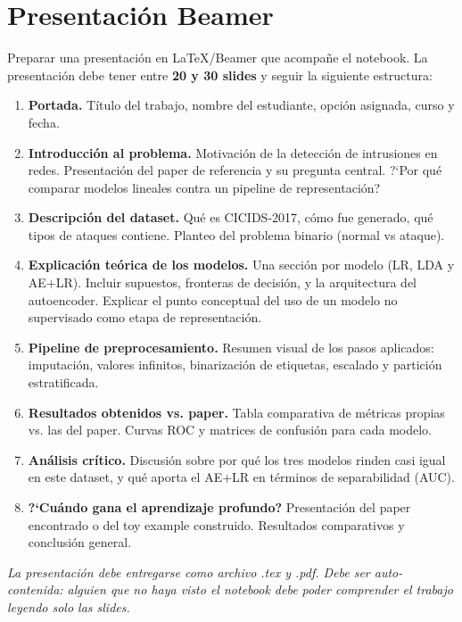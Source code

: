 \documentclass[11pt,a4paper]{article}
\begin{document}
\section{Presentaci\'on Beamer}
Preparar una presentaci\'on en LaTeX/Beamer que acompa\~ne el notebook. La presentaci\'on debe tener entre \textbf{20 y 30 slides} y seguir la siguiente estructura:
\begin{enumerate}[leftmargin=2em,itemsep=3pt]
    \item \textbf{Portada.} T\'itulo del trabajo, nombre del estudiante, opci\'on asignada, curso y fecha.
    \item \textbf{Introducci\'on al problema.} Motivaci\'on de la detecci\'on de intrusiones en redes. Presentaci\'on del paper de referencia y su pregunta central. ?`Por qu\'e comparar modelos lineales contra un pipeline de representaci\'on?
    \item \textbf{Descripci\'on del dataset.} Qu\'e es CICIDS-2017, c\'omo fue generado, qu\'e tipos de ataques contiene. Planteo del problema binario (normal vs ataque).
    \item \textbf{Explicaci\'on te\'orica de los modelos.} Una secci\'on por modelo (LR, LDA y AE+LR). Incluir supuestos, fronteras de decisi\'on, y la arquitectura del autoencoder. Explicar el punto conceptual del uso de un modelo no supervisado como etapa de representaci\'on.
    \item \textbf{Pipeline de preprocesamiento.} Resumen visual de los pasos aplicados: imputaci\'on, valores infinitos, binarizaci\'on de etiquetas, escalado y partici\'on estratificada.
    \item \textbf{Resultados obtenidos vs. paper.} Tabla comparativa de m\'etricas propias vs. las del paper. Curvas ROC y matrices de confusi\'on para cada modelo.
    \item \textbf{An\'alisis cr\'itico.} Discusi\'on sobre por qu\'e los tres modelos rinden casi igual en este dataset, y qu\'e aporta el AE+LR en t\'erminos de separabilidad (AUC).
    \item \textbf{?`Cu\'ando gana el aprendizaje profundo?} Presentaci\'on del paper encontrado o del toy example construido. Resultados comparativos y conclusi\'on general.
\end{enumerate}
\textit{La presentaci\'on debe entregarse como archivo .tex y .pdf. Debe ser auto-contenida: alguien que no haya visto el notebook debe poder comprender el trabajo leyendo solo las slides.}
\end{document}
